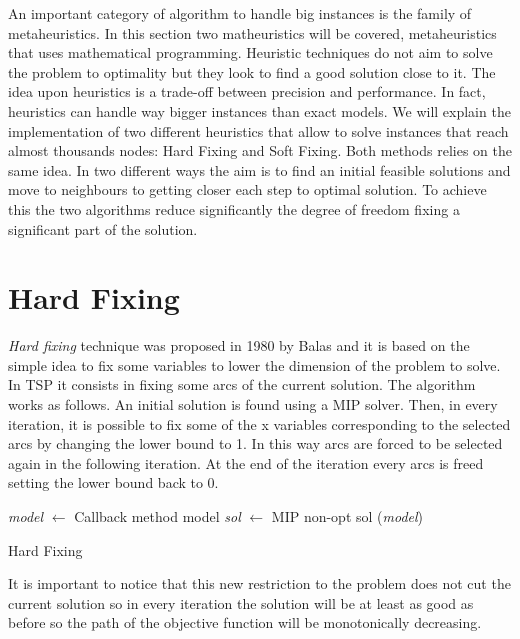 An important category of algorithm to handle big instances is the family of
metaheuristics. In this section two matheuristics will be covered,
metaheuristics that uses mathematical programming. Heuristic techniques do not
aim to solve the problem to optimality but they look to find a good solution
close to it. The idea upon heuristics is a trade-off between precision and
performance. In fact, heuristics can handle way bigger instances than exact
models. We will explain the implementation of two different heuristics that
allow to solve instances that reach almost thousands nodes: Hard Fixing and
Soft Fixing. Both methods relies on the same idea. In two different ways the
aim is to find an initial feasible solutions and move to neighbours to getting
closer each step to optimal solution. To achieve this the two algorithms reduce
significantly the degree of freedom fixing a significant part of the solution. 

\section{Hard Fixing}
\emph{Hard fixing} technique was proposed in 1980 by Balas \cite{balas1980pivot} and
it is based on the simple idea to fix some variables to lower the dimension of
the problem to solve. In TSP it consists in fixing some arcs of the current
solution. The algorithm works as follows. An initial solution is found using a
MIP solver. Then, in every iteration, it is possible to fix some of the x
variables corresponding to the selected arcs by changing the lower bound to 1.
In this way arcs are forced to be selected again in the following iteration. At
the end of the iteration every arcs is freed setting the lower bound back to 0.


\begin{algorithm}[H]
\SetAlgoLined
{}
    \emph{model} $\leftarrow$ Callback method model\;
    \emph{sol} $\leftarrow$ MIP non-opt sol (\emph{model})\;
    \caption{Hard Fixing}
\end{algorithm}

It is important to notice that this new restriction to the problem does not cut
the current solution so in every iteration the solution will be at least as
good as before so the path of the objective function will be monotonically
decreasing.

